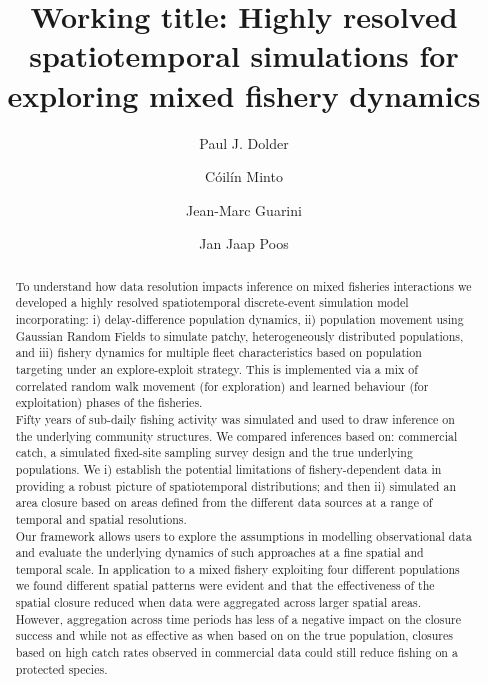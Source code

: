 \documentclass[review]{elsarticle}
\begin{document}
\begin{frontmatter}
\title{Working title: Highly resolved spatiotemporal simulations for
	exploring mixed fishery dynamics}

\author[1,2]{Paul J. Dolder}

\author[1]{Cóilín Minto}
\author[3]{Jean-Marc Guarini}
\author[4,5]{Jan Jaap Poos}

\address[1]{Galway-Mayo Institute of Technology (GMIT), Dublin Road, Galway,
	Ireland} 
\address[2]{Centre for Environment, Fisheries and Aquaculture Science (Cefas),
	Pakefield Road, Lowestoft, UK}
\address[3]{Sorbonne Université, Faculty of Sciences, 4 Place Jussieu, 75005
	Paris, France}
\address[4]{Wageningen Marine Research, Haringkade 1 1976 CP IJmuiden,
	Netherlands}
\address[5]{Aquaculture and Fisheries Group, Wageningen University \& Research,
	Zodiac Building 122, De Elst 1, 6708 WD Wageningen, the Netherlands}


\begin{abstract}

To understand how data resolution impacts inference on mixed fisheries
interactions we developed a highly resolved spatiotemporal discrete-event
simulation model incorporating: i) delay-difference population dynamics, ii)
population movement using Gaussian Random Fields to simulate patchy,
heterogeneously distributed populations, and iii) fishery dynamics for multiple
fleet characteristics based on population targeting under an explore-exploit
strategy. This is implemented via a mix of correlated random walk movement (for
exploration) and learned behaviour (for exploitation) phases of the fisheries. \\ 
Fifty years of sub-daily fishing activity was simulated and used to draw
inference on the underlying community structures. We compared inferences based
on: commercial catch, a simulated fixed-site sampling survey design and the
true underlying populations. We i) establish the potential limitations of
fishery-dependent data in providing a robust picture of spatiotemporal
distributions; and then ii) simulated an area closure based on areas defined
from the different data sources at a range of temporal and spatial resolutions.\\
Our framework allows users to explore the assumptions in modelling
observational data and evaluate the underlying dynamics of such approaches at a
fine spatial and temporal scale. In application to a mixed fishery exploiting
four different populations we found different spatial patterns were evident and
that the effectiveness of the spatial closure reduced when data were aggregated
across larger spatial areas. However, aggregation across time periods has less
of a negative impact on the closure success and while not as effective as when
based on on the true population, closures based on high catch rates observed in
commercial data could still reduce fishing on a protected species. \\ 


\end{abstract}
\end{frontmatter}
\end{document}
